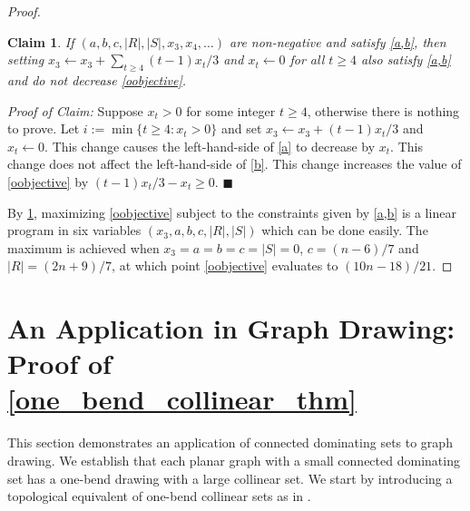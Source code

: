 \documentclass{article}
\newtheorem{clm}{Claim}
\newenvironment{clmproof}{\noindent\emph{Proof of Claim:}}{\hfill{$\blacksquare$}\par}
\theoremstyle{definition}
\begin{document}
\begin{proof}
  \begin{clm}\label{simplify}
    If $(a,b,c,|R|,|S|,x_3,x_4,\ldots)$ are non-negative and satisfy \cref{a,b}, then setting $x_3\gets x_3+\sum_{t\ge 4}(t-1)x_t/3$ and $x_t\gets 0$ for all $t\ge 4$ also satisfy \cref{a,b} and do not decrease \cref{oobjective}.
  \end{clm}

  \begin{clmproof}
    Suppose $x_t>0$ for some integer $t\ge 4$, otherwise there is nothing to prove.  Let $i:=\min\{t\ge 4: x_t>0\}$ and set $x_3\gets x_3+(t-1)x_t/3$ and $x_t\gets 0$. This change causes the left-hand-side of \cref{a} to decrease by $x_t$. This change does not affect the left-hand-side of \cref{b}.  This change increases the value of \cref{oobjective} by $(t-1)x_t/3-x_t\ge 0$.
  \end{clmproof}

  By \cref{simplify}, maximizing \cref{oobjective} subject to the constraints given by \cref{a,b} is a linear program in six variables $(x_3,a,b,c,|R|,|S|)$ which can be done easily.  The maximum is achieved when $x_3=a=b=c=|S|=0$, $c=(n-6)/7$ and $|R|=(2n+9)/7$, at which point \cref{oobjective} evaluates to $(10n-18)/21$.
\end{proof}






\section{An Application in Graph Drawing: Proof of \cref{one_bend_collinear_thm}}
\label{one_bend}
This section demonstrates an application of connected dominating sets to graph drawing. We establish that each planar graph with a small connected dominating set has a one-bend drawing with a large collinear set. We start by introducing a topological equivalent of one-bend collinear sets as in \cite{DBLP:journals/jocg/LozzoDFMR18}.


\end{document}
